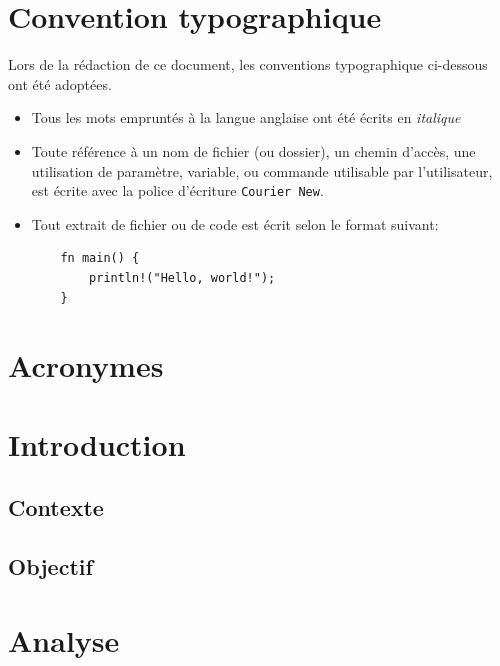 \documentclass[a4paper]{article}
\begin{document}
\section*{Convention typographique}
Lors de la rédaction de ce document, les conventions typographique ci-dessous ont
été adoptées.
\begin{itemize}[label=\textbullet]
	\item Tous les mots empruntés à la langue anglaise ont été écrits en \textit{italique}
	\item Toute référence à un nom de fichier (ou dossier), un chemin d’accès, une 
    utilisation de paramètre, variable, ou commande utilisable par l’utilisateur, 
    est écrite avec la police d’écriture \texttt{Courier New}.
	\item Tout extrait de fichier ou de code est écrit selon le format suivant:
    \begin{verbatim}
    fn main() {
        println!("Hello, world!");
    }
    \end{verbatim}
\end{itemize}
\newpage

\section*{Acronymes}
\newpage


\section{Introduction}
\subsection{Contexte}


\subsection{Objectif}


\section{Analyse}
\end{document}
